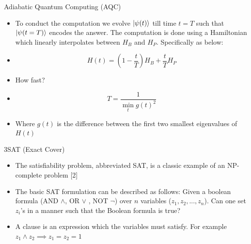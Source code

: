 \documentclass[
  ignorenonframetext,
]{beamer}
\providecommand{\tightlist}{%
  \setlength{\itemsep}{0pt}\setlength{\parskip}{0pt}}
\begin{document}
\begin{frame}{Adiabatic Quantum Computing (AQC)}
\protect\hypertarget{adiabatic-quantum-computing-aqc-2}{}

\begin{itemize}[<+->]
\tightlist
\item
  To conduct the computation we evolve \(\ket{\psi(t)}\) till time
  \(t=T\) such that \(\ket{\psi(t=T)}\) encodes the answer. The
  computation is done using a Hamiltonian which linearly interpolates
  between \(H_B\) and \(H_P\). Specifically as below:
\end{itemize}

\begin{itemize}[<+->]
\tightlist
\item
  \[
  H(t) = \left(1 - \frac{t}{T}\right)H_B + \frac{t}{T}H_P
  \]
\item
  How fast?
\item
  \[
  T =  \frac{1}{\min_t  g(t)^2}
  \]
\item
  Where \(g(t)\) is the difference between the first two smallest
  eigenvalues of \(H(t)\)
\end{itemize}

\end{frame}

\begin{frame}{3SAT (Exact Cover)}
\protect\hypertarget{sat-exact-cover}{}

\begin{itemize}[<+->]
\tightlist
\item
  The satisfiability problem, abbreviated SAT, is a classic example of
  an NP-complete problem {[}2{]}
\item
  The basic SAT formulation can be described as follows: Given a boolean
  formula (AND \(\land\), OR \(\lor\) , NOT \(\neg\)) over \(n\)
  variables (\(z_1, z_2, ... , z_n\)). Can one set \(z_i\)'s in a manner
  such that the Boolean formula is true?
\item
  A clause is an expression which the variables must satisfy. For
  example \(z_1 \land z_2 \implies z_1 = z_2 = 1\)
\end{itemize}

\end{frame}
\end{document}
